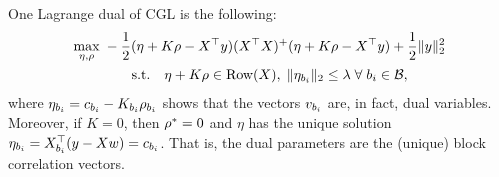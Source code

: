 
\begin{lemma}\label{lemma:lagrange-dual}
    One Lagrange dual of CGL is the following:
    \begin{equation}\label{eq:dual-program}
        \begin{aligned}
            \max_{\eta, \rho} \;
             & - \frac 1 2 (\eta + K \rho - X^\top y) (X^\top X)^+ (\eta + K \rho - X^\top y) + \frac 1 2 \|y\|_2^2                         \\
             & \quad \quad \text{s.t.} \quad \eta + K \rho \in \text{Row}(X), \; \|\eta_{b_i}\|_2 \leq \lambda \; \forall \; {b_i} \in \mathcal{B},
        \end{aligned}
    \end{equation}
    where \( \eta_{b_i} = c_{b_i} - K_{{b_i}} \rho_{{b_i}} \) shows that the vectors \( v_{b_i} \)
    are, in fact, dual variables.
    Moreover, if \( K = 0 \), then \( \rho^* = 0 \) and \( \eta \)
    has the unique solution \( \eta_{b_i} = X_{b_i}^\top (y -  Xw) = c_{b_i} \).
    That is, the dual parameters are the (unique) block correlation vectors.
\end{lemma}
